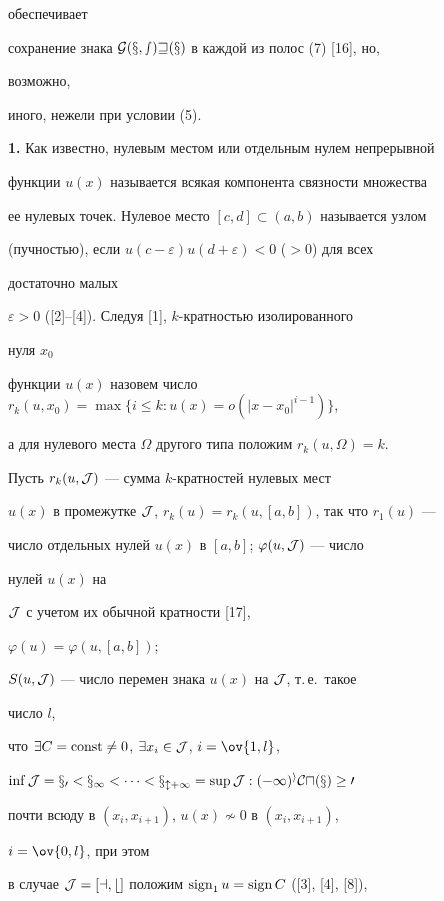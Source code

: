 обеспечивает 


сохранение знака $\cal G(x,s)w(x)$ в каждой из полос (7) [16], но, 


возможно, 


иного, нежели при условии (5). 


\medskip 


 


{\bf 1.} Как известно, нулевым местом или отдельным нулем непрерывной 


функции $u(x)$ называется всякая компонента связности множества 


ее нулевых точек. Нулевое место $[c,d]\subset(a,b)$ называется узлом 


(пучностью), если $u(c-\varepsilon)u(d+\varepsilon)<0$ ($>0$) для всех 


достаточно малых 


$\varepsilon>0$ ([2]--[4]). Следуя [1], $k$-кратностью изолированного 


нуля $x_0$ 


функции $u(x)$ назовем число $r_k(u,x_0)=\max\{i\le 


k:u(x)=o(|x-x_0|^{i-1})\}$, 


а для нулевого места $\Omega$ другого типа положим $r_k(u,\Omega)=k$. 


Пусть $r_k(u,\cal J)$ --- сумма $k$-кратностей нулевых мест 


$u(x)$ в промежутке $\cal J$, $r_k(u)=r_k(u,[a,b])$, так что $r_1(u)$ --- 


число отдельных нулей $u(x)$ в $[a,b]$; $\varphi(u,\cal J)$ --- число 


нулей $u(x)$ на 


$\cal J$ с учетом их обычной кратности [17], 


$\varphi(u)=\varphi(u,[a,b])$; 


$S(u,\cal J)$ --- число перемен знака $u(x)$ на $\cal J$, т.\,е.~такое 


число $l$, 


что $\exists C=\operatorname{const}\ne 0$, $\exists x_i\in \cal J$, $i=\ov{1,l}$, 


$\inf\cal J=x_0<x_1<\dotsb<x_{l+1}=\sup\cal J:(-1)^i C u(x)\ge 0$ 


почти всюду в $(x_i,x_{i+1})$, $u(x)\nsim 0$ в $(x_i,x_{i+1})$, 


$i=\ov{0,l}$, при этом 


в случае $\cal J=[a,b]$ положим $\operatorname{sign}_1u=\operatorname{sign} C$ ([3], [4], [8]), 



